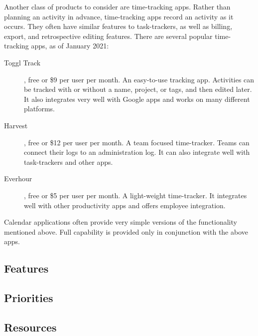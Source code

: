 \documentclass{article}
\begin{document}
Another class of products to consider are time-tracking apps.
Rather than planning an activity in advance, time-tracking apps record an activity as it occurs.
They often have similar features to task-trackers, as well as billing, export, and retrospective editing features.
There are several popular time-tracking apps, as of January 2021:

\begin{description}
    \item[Toggl Track], free or \$9 per user per month.
    An easy-to-use tracking app.
    Activities can be tracked with or without a name, project, or tags, and then edited later.
    It also integrates very well with Google apps and works on many different platforms.
    \item[Harvest], free or \$12 per user per month.
    A team focused time-tracker.
    Teams can connect their logs to an administration log.
    It can also integrate well with task-trackers and other apps.
    \item[Everhour], free or \$5 per user per month.
    A light-weight time-tracker.
    It integrates well with other productivity apps and offers employee integration.
\end{description}

Calendar applications often provide very simple versions of the functionality mentioned above.
Full capability is provided only in conjunction with the above apps.

\subsection{Features}


\subsection{Priorities}


\subsection{Resources}

\end{document}

